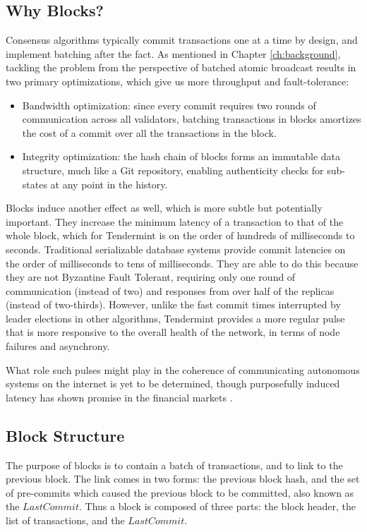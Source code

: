 \subsection{Why Blocks?}
Consensus algorithms typically commit transactions one at a time by design, 
and implement batching after the fact.
As mentioned in Chapter \ref{ch:background}, 
tackling the problem from the perspective of batched atomic broadcast
results in two primary optimizations, which give us more throughput and fault-tolerance:

\begin{itemize}
\item{Bandwidth optimization: since every commit requires two rounds of communication across all validators, 
	batching transactions in blocks amortizes the cost of a commit over all the transactions in the block.}
\item{Integrity optimization: the hash chain of blocks forms an immutable data structure, much like a Git repository, enabling authenticity checks for sub-states at any point in the history.}
\end{itemize}

Blocks induce another effect as well, which is more subtle but potentially important. 
They increase the minimum latency of a transaction to that of the whole block, 
which for Tendermint is on the order of hundreds of milliseconds to seconds.
Traditional serializable database systems provide commit latencies on the 
order of milliseconds to tens of milliseconds.
They are able to do this because they are not Byzantine Fault Tolerant, 
requiring only one round of communication (instead of two)
and responses from over half of the replicas (instead of two-thirds).
However, unlike the fast commit times interrupted by leader elections in other algorithms,
Tendermint provides a more regular pulse that is more responsive to the overall health of the network, 
in terms of node failures and asynchrony.

What role such pulses might play in the coherence of 
communicating autonomous systems on the internet is yet to be determined,
though purposefully induced latency has shown promise in the financial markets \cite{ryan2015beyond}.

\subsection{Block Structure}

The purpose of blocks is to contain a batch of transactions, and to link to the previous block.
The link comes in two forms: the previous block hash,
and the set of pre-commits which caused the previous block to be committed, also known as the $LastCommit$.
Thus a block is composed of three parts: the block header, the list of transactions, and the $LastCommit$.

